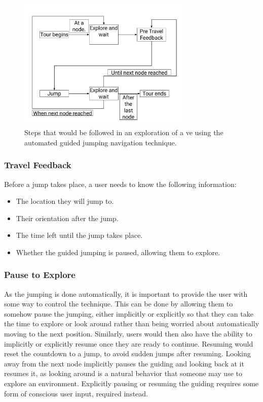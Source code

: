 \begin{figure}[]
	\centering
	\includegraphics[width=0.75\textwidth]{images/interaction-design-steps.pdf}
	\caption{Steps that would be followed in an exploration of a \acrshort{ve} using the automated guided jumping navigation technique.}
	\label{fig:interaction-design-steps}
\end{figure}

\subsubsection{Travel Feedback}
\label{subsubsection AGJ ID ES: Travel Feedback}
Before a jump takes place, a user needs to know the following information:
\begin{itemize}
	\item The location they will jump to.
	\item Their orientation after the jump.
	\item The time left until the jump takes place.
	\item Whether the guided jumping is paused, allowing them to explore.
\end{itemize}

\subsubsection{Pause to Explore}
\label{subsubsection AGJ ID ES: Pause to Explore}
As the jumping is done automatically, it is important to provide the user with some way to control the technique. This can be done by allowing them to somehow pause the jumping, either implicitly or explicitly so that they can take the time to explore or look around rather than being worried about automatically moving to the next position. Similarly, users would then also have the ability to implicitly or explicitly resume once they are ready to continue. Resuming would reset the countdown to a jump, to avoid sudden jumps after resuming. Looking away from the next node implicitly pauses the guiding and looking back at it resumes it, as looking around is a natural behavior that someone may use to explore an environment. Explicitly pausing or resuming the guiding requires some form of conscious user input, required instead.    

